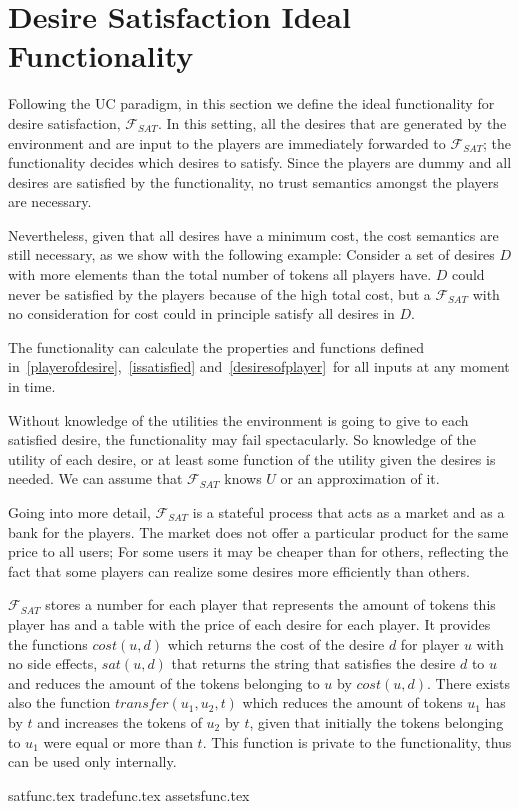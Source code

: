 \section{Desire Satisfaction Ideal Functionality}
  Following the UC paradigm, in this section we define the ideal functionality for desire
  satisfaction, $\mathcal{F}_{SAT}$.  In this setting, all the desires that are generated
  by the environment and are input to the players are immediately forwarded to
  $\mathcal{F}_{SAT}$; the functionality decides which desires to satisfy. Since the
  players are dummy and all desires are satisfied by the functionality, no trust semantics
  amongst the players are necessary.

  Nevertheless, given that all desires have a minimum cost, the cost semantics are still
  necessary, as we show with the following example: Consider a set of desires $D$ with
  more elements than the total number of tokens all players have. $D$ could never be
  satisfied by the players because of the high total cost, but a $\mathcal{F}_{SAT}$ with
  no consideration for cost could in principle satisfy all desires in $D$.

  The functionality can calculate the properties and functions defined
  in~\ref{playerofdesire},~\ref{issatisfied} and~\ref{desiresofplayer}\ for all inputs at
  any moment in time.

  Without knowledge of the utilities the environment is going to give to each satisfied
  desire, the functionality may fail spectacularly. So knowledge of the utility of each
  desire, or at least some function of the utility given the desires is needed. We can
  assume that $\mathcal{F}_{SAT}$ knows $U$ or an approximation of it.

  Going into more detail, $\mathcal{F}_{SAT}$ is a stateful process that acts as a market
  and as a bank for the players. The market does not offer a particular product for the
  same price to all users; For some users it may be cheaper than for others, reflecting
  the fact that some players can realize some desires more efficiently than others.

  $\mathcal{F}_{SAT}$ stores a number for each player that represents the amount of tokens
  this player has and a table with the price of each desire for each player. It provides
  the functions $cost\left(u, d\right)$ which returns the cost of the desire $d$ for
  player $u$ with no side effects, $sat\left(u, d\right)$ that returns the string that
  satisfies the desire $d$ to $u$ and reduces the amount of the tokens belonging to $u$ by
  $cost\left(u, d\right)$. There exists also the function $transfer\left(u_1, u_2,
  t\right)$ which reduces the amount of tokens $u_1$ has by $t$ and increases the tokens
  of $u_2$ by $t$, given that initially the tokens belonging to $u_1$ were equal or more
  than $t$. This function is private to the functionality, thus can be used only
  internally.

  {satfunc.tex}
  {tradefunc.tex}
  {assetsfunc.tex}
